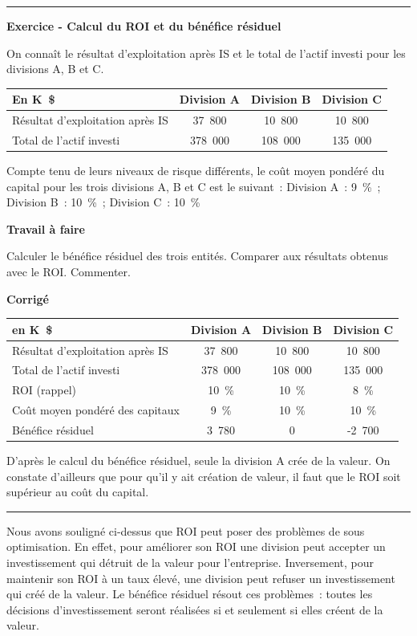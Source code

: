 \documentclass[oneside]{kaobook}
\begin{document}
\noindent\rule{\textwidth}{0.5pt}
\textbf{Exercice -  Calcul du ROI et du bénéfice résiduel}

On connaît le résultat d'exploitation après IS et le total de l'actif investi pour les divisions A, B et C.
\begin{center}
\footnotesize
\begin{tabular}{l c c c}
En K \$ & Division A & Division B & Division C\\
\hline
Résultat d'exploitation après IS & 37 800 & 10 800 & 10 800\\
Total de l'actif investi & 378 000 & 108 000 & 135 000\\
\end{tabular}
\end{center}
Compte tenu de leurs niveaux de risque différents, le coût moyen pondéré
du capital pour les trois divisions A, B et C est le suivant : Division
A : 9 \% ; Division B : 10 \% ; Division C : 10 \%

\textbf{Travail à faire}

Calculer le bénéfice résiduel des trois entités. Comparer aux résultats
obtenus avec le ROI. Commenter.

\textbf{Corrigé}

\begin{center}
\footnotesize
\begin{tabular}{l c c c}
en K \$ & Division A & Division B & Division C\\
\hline
Résultat d'exploitation après IS & 37 800 & 10 800 & 10 800\\
Total de l'actif investi & 378 000 & 108 000 & 135 000\\
ROI (rappel) & 10 \% & 10 \% & 8 \%\\
Coût moyen pondéré des capitaux & 9 \% & 10 \% & 10 \%\\
Bénéfice résiduel & 3 780 & 0 & -2 700\\
\end{tabular}
\end{center}
D'après le calcul du bénéfice résiduel, seule la division A crée de la valeur. On constate d'ailleurs que pour qu'il y ait création de valeur, il faut que le ROI soit supérieur au coût du capital. 

\noindent\rule{\textwidth}{0.5pt}

Nous avons souligné ci-dessus que ROI peut poser des problèmes de sous optimisation. En effet, pour améliorer son ROI une division peut accepter un investissement qui détruit de la valeur pour l'entreprise. Inversement, pour maintenir son ROI à un taux élevé, une division peut refuser un investissement qui créé de la valeur. Le bénéfice résiduel résout ces problèmes : toutes les décisions d'investissement seront réalisées si et seulement si elles créent de la valeur.
\end{document}
